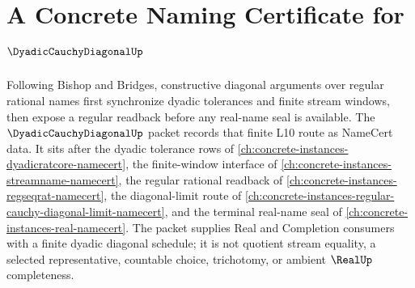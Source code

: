 \chapter{A Concrete Naming Certificate for $\DyadicCauchyDiagonalUp$}
\label{ch:concrete-instances-dyadic-cauchy-diagonal-namecert}

Following Bishop and Bridges, constructive diagonal arguments over regular rational names first synchronize dyadic tolerances and finite stream windows, then expose a regular readback before any real-name seal is available. The $\DyadicCauchyDiagonalUp$ packet records that finite L10 route as NameCert data. It sits after the dyadic tolerance rows of \autoref{ch:concrete-instances-dyadicratcore-namecert}, the finite-window interface of \autoref{ch:concrete-instances-streamname-namecert}, the regular rational readback of \autoref{ch:concrete-instances-regseqrat-namecert}, the diagonal-limit route of \autoref{ch:concrete-instances-regular-cauchy-diagonal-limit-namecert}, and the terminal real-name seal of \autoref{ch:concrete-instances-real-namecert}. The packet supplies Real and Completion consumers with a finite dyadic diagonal schedule; it is not quotient stream equality, a selected representative, countable choice, trichotomy, or ambient $\RealUp$ completeness.

